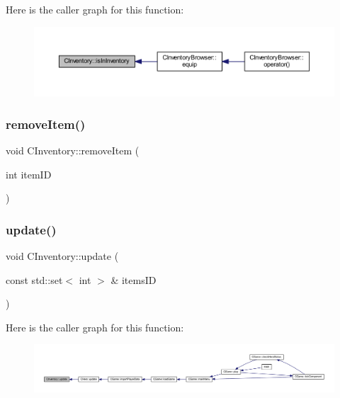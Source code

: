 Here is the caller graph for this function\+:\nopagebreak
\begin{figure}[H]
\begin{center}
\leavevmode
\includegraphics[width=350pt]{class_c_inventory_abd92c94b31dc928c1047423e98309bd7_icgraph}
\end{center}
\end{figure}
\mbox{\label{class_c_inventory_a0df34d3e77a17faa6585c11611258135}} 
\subsubsection{\texorpdfstring{remove\+Item()}{removeItem()}}
{\footnotesize\ttfamily void C\+Inventory\+::remove\+Item (\begin{DoxyParamCaption}\item[{int}]{item\+ID }\end{DoxyParamCaption})\hspace{0.3cm}{\ttfamily [inline]}}

\mbox{\label{class_c_inventory_a2ae39f69247c25fa2ee46c4111bcce56}} 
\subsubsection{\texorpdfstring{update()}{update()}\hspace{0.1cm}{\footnotesize\ttfamily [1/2]}}
{\footnotesize\ttfamily void C\+Inventory\+::update (\begin{DoxyParamCaption}\item[{const std\+::set$<$ int $>$ \&}]{items\+ID }\end{DoxyParamCaption})\hspace{0.3cm}{\ttfamily [inline]}}

Here is the caller graph for this function\+:\nopagebreak
\begin{figure}[H]
\begin{center}
\leavevmode
\includegraphics[width=350pt]{class_c_inventory_a2ae39f69247c25fa2ee46c4111bcce56_icgraph}
\end{center}
\end{figure}
\mbox{\label{class_c_inventory_a0e551d2fbd87a61bb2b56ce58cacbe1f}} 
